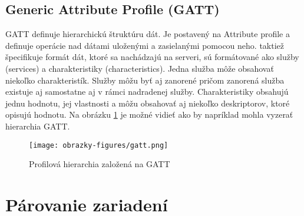 \subsection{Generic Attribute Profile (GATT)}\label{sec:gatt}

GATT definuje hierarchickú štruktúru dát. Je postavený na Attribute profile a definuje operácie nad dátami uloženými a zasielanými pomocou neho. taktiež špecifikuje formát dát, ktoré sa nachádzajú na serveri, sú formátované ako služby (services) a charakteristiky (characteristics). Jedna služba môže obsahovať niekoľko charakteristík. Služby môžu byť aj zanorené pričom zanorená služba existuje aj samostatne aj v rámci nadradenej služby. Charakteristiky obsahujú jednu hodnotu, jej vlastnosti a môžu obsahovať aj niekoľko deskriptorov, ktoré opisujú hodnotu. Na obrázku \ref{fig:gatt} je možné vidieť ako by napríklad mohla vyzerať hierarchia GATT.\cite{bluetooth}

\begin{figure}[ht]
    \centering
    \texttt{[image: obrazky-figures/gatt.png]}
    \caption{Profilová hierarchia založená na GATT\cite{bluetooth}}
    \label{fig:gatt}
\end{figure}


\section{Párovanie zariadení}

